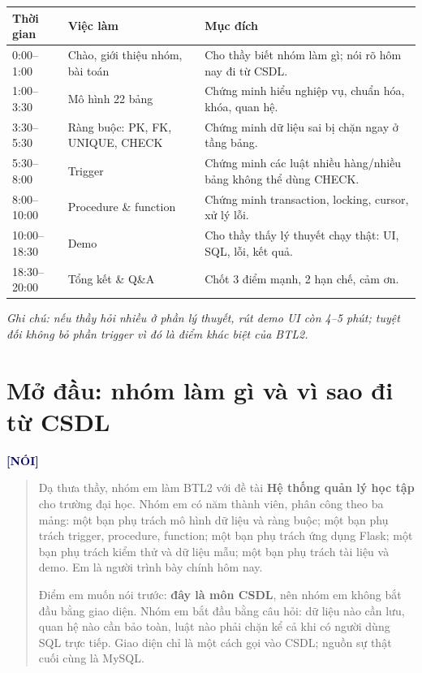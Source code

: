 \documentclass[a4paper,13pt]{extarticle}
\newcommand{\cue}[1]{\par\smallskip\noindent\textbf{\textcolor{navy}{[#1]}}\par\nopagebreak\smallskip}
\newenvironment{loi}{\begin{quote}\setlength{\parindent}{0pt}}{\end{quote}}
\begin{document}
\begin{longtable}{p{2.1cm}p{4.4cm}p{7.6cm}}
\toprule
\textbf{Thời gian} & \textbf{Việc làm} & \textbf{Mục đích} \\
\midrule
\endhead
0:00--1:00 & Chào, giới thiệu nhóm, bài toán & Cho thầy biết nhóm làm gì; nói rõ hôm nay đi từ CSDL. \\
1:00--3:30 & Mô hình 22 bảng & Chứng minh hiểu nghiệp vụ, chuẩn hóa, khóa, quan hệ. \\
3:30--5:30 & Ràng buộc: PK, FK, UNIQUE, CHECK & Chứng minh dữ liệu sai bị chặn ngay ở tầng bảng. \\
5:30--8:00 & Trigger & Chứng minh các luật nhiều hàng/nhiều bảng không thể dùng CHECK. \\
8:00--10:00 & Procedure \& function & Chứng minh transaction, locking, cursor, xử lý lỗi. \\
10:00--18:30 & Demo & Cho thầy thấy lý thuyết chạy thật: UI, SQL, lỗi, kết quả. \\
18:30--20:00 & Tổng kết \& Q\&A & Chốt 3 điểm mạnh, 2 hạn chế, cảm ơn. \\
\bottomrule
\end{longtable}

\noindent\textit{Ghi chú: nếu thầy hỏi nhiều ở phần lý thuyết, rút demo UI còn 4--5 phút; tuyệt đối không bỏ phần trigger vì đó là điểm khác biệt của BTL2.}

\section{Mở đầu: nhóm làm gì và vì sao đi từ CSDL}

\cue{NÓI}
\begin{loi}
Dạ thưa thầy, nhóm em làm BTL2 với đề tài \textbf{Hệ thống quản lý học tập} cho trường đại học. Nhóm em có năm thành viên, phân công theo ba mảng: một bạn phụ trách mô hình dữ liệu và ràng buộc; một bạn phụ trách trigger, procedure, function; một bạn phụ trách ứng dụng Flask; một bạn phụ trách kiểm thử và dữ liệu mẫu; một bạn phụ trách tài liệu và demo. Em là người trình bày chính hôm nay.

Điểm em muốn nói trước: \textbf{đây là môn CSDL}, nên nhóm em không bắt đầu bằng giao diện. Nhóm em bắt đầu bằng câu hỏi: dữ liệu nào cần lưu, quan hệ nào cần bảo toàn, luật nào phải chặn kể cả khi có người dùng SQL trực tiếp. Giao diện chỉ là một cách gọi vào CSDL; nguồn sự thật cuối cùng là MySQL.
\end{loi}
\end{document}
